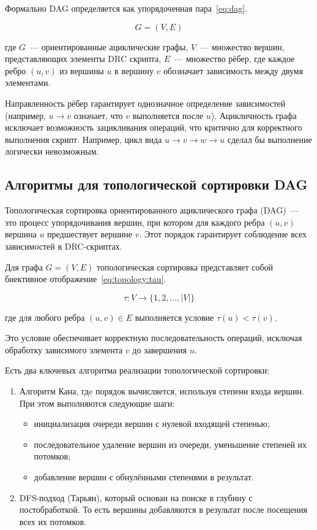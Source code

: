 Формально DAG определяется как упорядоченная пара~\eqref{eq:dag}.

\begin{equation}\label{eq:dag}
G = (V, E)
\end{equation}

где \( G \)~--- ориентированные ациклические графы,
\( V \)~--- множество вершин,
представляющих элементы DRC скрипта,
\( E \)~--- множество рёбер,
где каждое ребро \( (u, v) \) из вершины \( u \) в вершину \( v \)
обозначает зависимость между двумя элементами.

Направленность рёбер гарантирует однозначное определение зависимостей 
(например, \( u \to v \) означает, что \( v \) выполняется после \( u \)).
Ацикличность графа исключает возможность зацикливания операций,
что критично для корректного выполнения скрипт.
Например, цикл вида \( u \to v \to w \to u \)
сделал бы выполнение логически невозможным.

\subsection{Алгоритмы для топологической сортировки DAG}
\label{section:algs:topology-sort-dag}

Топологическая сортировка ориентированного ациклического графа (DAG)~---
это процесс упорядочивания вершин,
при котором для каждого ребра \( (u, v) \)
вершина \( u \) предшествует вершине \( v \).
Этот порядок гарантирует соблюдение всех зависимостей в DRC-скриптах.

Для графа \( G = (V, E) \)
топологическая сортировка представляет
собой биективное отображение~\eqref{eq:topology:tau}.

\begin{equation}\label{eq:topology:tau}
	\tau: V \to \{1, 2, \ldots, |V|\}
\end{equation}

где для любого ребра \( (u, v) \in E \)
выполняется условие \( \tau(u) < \tau(v) \).

Это условие обеспечивает корректную последовательность операций,
исключая обработку зависимого элемента \( v \) до завершения \( u \).

Есть два ключевых алгоритма реализации топологической сортировки:

\begin{enumerate}
    \item Алгоритм Кана, гдe
		порядок вычисляется, используя степени входа вершин.
		При этом выполняются следующие шаги:
		\begin{itemize}
			\item инициализация очереди вершин с нулевой входящей степенью;
			\item последовательное удаление вершин из очереди,
				уменьшение степеней их потомков;
			\item добавление вершин с обнулёнными степенями в результат.
		\end{itemize}
	\item DFS-подход (Тарьян), который
		основан на поиске в глубину с постобработкой.
		То есть вершины добавляются
		в результат после посещения всех их потомков.
\end{enumerate}

